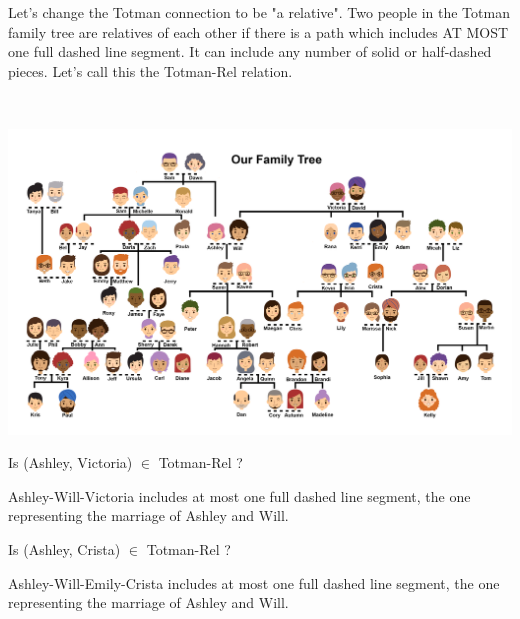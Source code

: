 \documentclass{ximera}
\begin{document}
                                                                                                            
Let's change the Totman connection to be "a relative". Two people in the Totman family tree are relatives of each other if there is a path which includes AT MOST one full dashed line segment. It can include any number of solid or half-dashed pieces. Let's call this the Totman-Rel relation.



\begin{exercise}
\quad \\
\begin{center}
\begin{image}
\includegraphics{Totman_Family_Tree.png}
\end{image}
\end{center}


\begin{problem} Is (Ashley, Victoria) $\in$ Totman-Rel ? 
\begin{feedback}
Ashley-Will-Victoria includes at most one full dashed line segment, the one representing the marriage of Ashley and Will.
\end{feedback}
\end{problem}


\begin{problem} Is (Ashley, Crista) $\in$ Totman-Rel ?  
\begin{feedback}
Ashley-Will-Emily-Crista includes at most one full dashed line segment, the one representing the marriage of Ashley and Will.
\end{feedback}
\end{problem}



\end{exercise}
\end{document}
